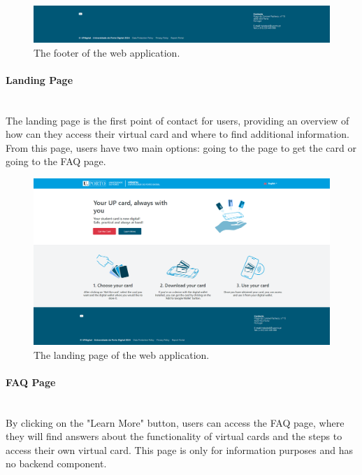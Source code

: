 \documentclass[12pt]{article}
\begin{document}
\begin{figure}[H]
	\centering
	\includegraphics[width=\textwidth]{footer.png}
	\caption{The footer of the web application.}
\end{figure}

\paragraph{Landing Page}\mbox{}\\
The landing page is the first point of contact for users, providing an overview
of how can they access their virtual card and where to find additional information.
From this page, users have two main options: going to the page to get the card or going to the FAQ page.

\begin{figure}[H]
	\centering
	\includegraphics[width=\textwidth]{landing_page.png}
	\caption{The landing page of the web application.}
\end{figure}

\paragraph{FAQ Page}\mbox{}\\
By clicking on the "Learn More" button, users can access the FAQ page, where they will
find answers about the functionality of virtual cards and the steps to access
their own virtual card. This page is only for information purposes and has no backend component.
\end{document}
